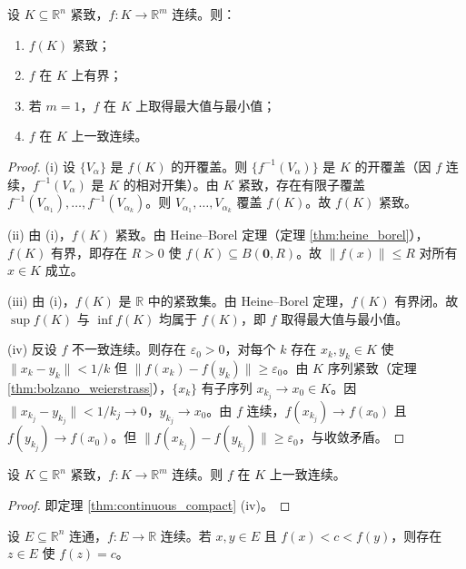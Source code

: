 \begin{theorem}[紧集上连续映射的性质]\label{thm:continuous_compact}
设 $K \subseteq \mathbb{R}^n$ 紧致，$f: K \to \mathbb{R}^m$ 连续。则：
\begin{enumerate}[label=(\roman*)]
    \item $f(K)$ 紧致；
    \item $f$ 在 $K$ 上有界；
    \item 若 $m = 1$，$f$ 在 $K$ 上取得最大值与最小值；
    \item $f$ 在 $K$ 上一致连续。
\end{enumerate}
\end{theorem}

\begin{proof}
(i) 设 $\{V_\alpha\}$ 是 $f(K)$ 的开覆盖。则 $\{f^{-1}(V_\alpha)\}$ 是 $K$ 的开覆盖（因 $f$ 连续，$f^{-1}(V_\alpha)$ 是 $K$ 的相对开集）。由 $K$ 紧致，存在有限子覆盖 $f^{-1}(V_{\alpha_1}), \dots, f^{-1}(V_{\alpha_k})$。则 $V_{\alpha_1}, \dots, V_{\alpha_k}$ 覆盖 $f(K)$。故 $f(K)$ 紧致。

(ii) 由 (i)，$f(K)$ 紧致。由 Heine--Borel 定理（定理 \ref{thm:heine_borel}），$f(K)$ 有界，即存在 $R > 0$ 使 $f(K) \subseteq B(\mathbf{0}, R)$。故 $\|f(x)\| \le R$ 对所有 $x \in K$ 成立。

(iii) 由 (i)，$f(K)$ 是 $\mathbb{R}$ 中的紧致集。由 Heine--Borel 定理，$f(K)$ 有界闭。故 $\sup f(K)$ 与 $\inf f(K)$ 均属于 $f(K)$，即 $f$ 取得最大值与最小值。

(iv) 反设 $f$ 不一致连续。则存在 $\varepsilon_0 > 0$，对每个 $k$ 存在 $x_k, y_k \in K$ 使 $\|x_k - y_k\| < 1/k$ 但 $\|f(x_k) - f(y_k)\| \ge \varepsilon_0$。由 $K$ 序列紧致（定理 \ref{thm:bolzano_weierstrass}），$\{x_k\}$ 有子序列 $x_{k_j} \to x_0 \in K$。因 $\|x_{k_j} - y_{k_j}\| < 1/k_j \to 0$，$y_{k_j} \to x_0$。由 $f$ 连续，$f(x_{k_j}) \to f(x_0)$ 且 $f(y_{k_j}) \to f(x_0)$。但 $\|f(x_{k_j}) - f(y_{k_j})\| \ge \varepsilon_0$，与收敛矛盾。
\end{proof}

\begin{corollary}\label{cor:heine_cantor}
设 $K \subseteq \mathbb{R}^n$ 紧致，$f: K \to \mathbb{R}^m$ 连续。则 $f$ 在 $K$ 上一致连续。
\end{corollary}

\begin{proof}
即定理 \ref{thm:continuous_compact} (iv)。
\end{proof}

\begin{theorem}[介值定理的推广]\label{thm:intermediate_value_general}
设 $E \subseteq \mathbb{R}^n$ 连通，$f: E \to \mathbb{R}$ 连续。若 $x, y \in E$ 且 $f(x) < c < f(y)$，则存在 $z \in E$ 使 $f(z) = c$。
\end{theorem}

